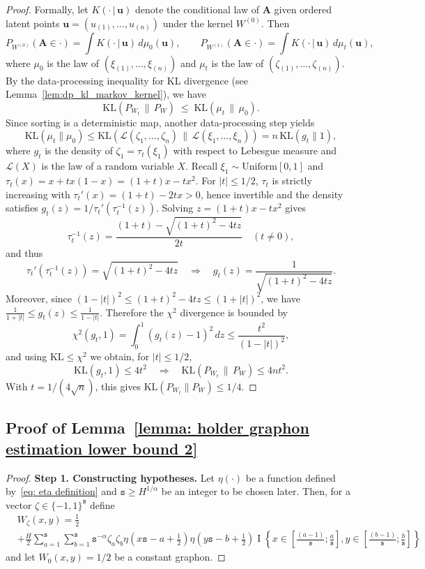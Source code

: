 \documentclass[11pt]{article}
\newcommand{\indicator}[1]{{\operatorname{I} \left \{ #1\right \}}}
\newcommand{\<}{\langle}
\renewcommand{\>}{\rangle}
\newcommand{\ts}{\mathtt{s}}
\theoremstyle{plain}
\theoremstyle{definition}
\theoremstyle{remark}
\begin{document}
{\begin{proof}
	Formally, let $K(\cdot\,|\,\mathbf u)$ denote the conditional law of $\mathbf A$ given ordered latent points
	$\mathbf u=(u_{(1)},\dots,u_{(n)})$ under the kernel $W^{(0)}$.
	Then
	\[
	P_{W^{(0)}}(\mathbf A\in\cdot)=\int K(\cdot\,|\,\mathbf u)\,d\mu_0(\mathbf u),
	\qquad
	P_{W^{(1)}}(\mathbf A\in\cdot)=\int K(\cdot\,|\,\mathbf u)\,d\mu_t(\mathbf u),
	\]
	where $\mu_0$ is the law of $(\xi_{(1)},\dots,\xi_{(n)})$ and $\mu_t$ is the law of $(\zeta_{(1)},\dots,\zeta_{(n)})$.
	By the data-processing inequality for KL divergence (see Lemma~\ref{lem:dp_kl_markov_kernel}), we have
	\[
	\mathrm{KL}\!\left(P_{W_t} \,\|\, P_{W}\right)
	\;\le\;
	\mathrm{KL}\!\left(\mu_t \,\|\, \mu_0\right).
	\]
	Since sorting is a deterministic map, another data-processing step yields
	\[
	\mathrm{KL}(\mu_t\|\mu_0)\le \mathrm{KL}\!\left(\mathcal L(\zeta_1,\dots,\zeta_n)\,\big\|\,\mathcal L(\xi_1,\dots,\xi_n)\right)
	= n\,\mathrm{KL}(g_t\|1),
	\]
	where $g_t$ is the density of $\zeta_1=\tau_t(\xi_1)$ with respect to Lebesgue measure and $\mathcal{L}(X)$ is the law of a random variable $X$.
	Recall $\xi_1\sim \mathrm{Uniform}[0,1]$ and $\tau_t(x)=x+t x(1-x)=(1+t)x-tx^2$.
	For $|t|\le 1/2$, $\tau_t$ is strictly increasing with $\tau_t'(x)=(1+t)-2tx>0$, hence invertible and  the density satisfies
	$g_t(z)=1/\tau_t'(\tau_t^{-1}(z))$.
	Solving $z=(1+t)x-tx^2$ gives
	\[
	\tau_t^{-1}(z)=\frac{(1+t)-\sqrt{(1+t)^2-4tz}}{2t}\quad (t\neq 0),
	\]
	and thus
	\[
	\tau_t'(\tau_t^{-1}(z))=\sqrt{(1+t)^2-4tz}
	\quad\Rightarrow\quad
	g_t(z)=\frac{1}{\sqrt{(1+t)^2-4tz}}.
	\]
	Moreover, since $(1-|t|)^2\le (1+t)^2-4tz\le (1+|t|)^2$, we have
	$\frac{1}{1+|t|}\le g_t(z)\le \frac{1}{1-|t|}$.
	Therefore the $\chi^2$ divergence is bounded by
	\[
	\chi^2(g_t, 1)=\int_0^1 (g_t(z)-1)^2\,dz \le \frac{t^2}{(1-|t|)^2},
	\]
	and using $\mathrm{KL}\le \chi^2$ we obtain, for $|t|\le 1/2$,
	\[
	\mathrm{KL}(g_t, 1)\le 4t^2
	\quad\Rightarrow\quad
	\mathrm{KL}\!\left(P_{W_t} \,\|\, P_{W}\right)\le 4n t^2.
	\]
	With $t=1/(4\sqrt{n})$, this gives $\mathrm{KL}(P_{W_t}\|P_{W})\le 1/4$.
\end{proof}

\subsection{Proof of Lemma~\ref{lemma: holder graphon estimation lower bound 2}}

\begin{proof}
\textbf{Step 1. Constructing hypotheses.} 
Let $\eta(\cdot)$ be a function defined by~\eqref{eq: eta definition} and $\ts \ge H^{1/\alpha}$ be an integer to be chosen later. Then, for a vector $\zeta \in \{-1, 1\}^\ts$ define
\begin{align*}
    & W_{\zeta}(x, y) = \frac{1}{2} \\
    &   + \frac{H}{2}\sum_{a = 1}^{\ts} \sum_{b =1}^{\ts } \ts^{-\alpha} \zeta_a \zeta_b \eta \left (x\ts - a + \frac{1}{2} \right ) \eta \left ( y \ts - b + \frac{1}{2} \right ) \indicator{x \in \left  [\frac{(a - 1)}{\ts}; \frac{a}{\ts} \right ], y \in \left [\frac{(b - 1)}{\ts}; \frac{b}{\ts}\right ]}
\end{align*}
and let $W_0(x, y) = 1/2$ be a constant graphon.


\end{proof}}
\end{document}
